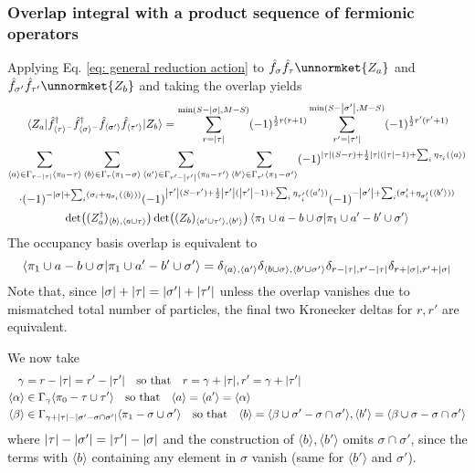 \documentclass[12pt]{article}
\newcommand{\seq}[1]{\langle #1\rangle}
\newcommand{\hc}{^\dagger}
\begin{document}
	\subsubsection{Overlap integral with a product sequence of fermionic operators}
	Applying Eq. \ref{eq: general reduction action} to $\hat{f}_{\sigma}\hat{f}_{\tau}\unnormket{Z_a}$ and $\hat{f}_{\sigma'}\hat{f}_{\tau'}\unnormket{Z_b}$ and taking the overlap yields
	\begin{multline}
	\mel{Z_a}{\hat{f}\hc_{\seq{\tau}^-}\hat{f}\hc_{\seq{\sigma}^-}\hat{f}_{\seq{\sigma'}}\hat{f}_{\seq{\tau'}}}{Z_b} = \sum_{r=\abs{\tau}}^{\min(S-\abs{\sigma}, M-S)}(-1)^{\frac{1}{2}r(r+1)}\sum_{r'=\abs{\tau'}}^{\min(S-\abs{\sigma'}, M-S)}(-1)^{\frac{1}{2}r'(r'+1)}\\
	\sum_{\seq{a}\in\Gamma_{r-\abs{\tau}}\seq{\pi_0-\tau}}\sum_{\seq{b}\in\Gamma_{r}\seq{\pi_1-\sigma}}\sum_{\seq{a'}\in\Gamma_{r'-\abs{\tau'}}\seq{\pi_0-\tau'}}\sum_{\seq{b'}\in\Gamma_{r'}\seq{\pi_1-\sigma'}}(-1)^{\abs{\tau}(S-r)+\frac{1}{2}\abs{\tau}(\abs{\tau}-1)+\sum_i\eta_{\tau_i}(\seq{a})}\\
	\cdot (-1)^{-\abs{\sigma}+\sum_i(\sigma_i+\eta_{\sigma_i}(\seq{b}))}(-1)^{\abs{\tau'}(S-r')+\frac{1}{2}\abs{\tau'}(\abs{\tau'}-1)+\sum_i\eta_{\tau'_i}(\seq{a'})}(-1)^{-\abs{\sigma'}+\sum_i(\sigma'_i+\eta_{\sigma'_i}(\seq{b'}))}\\
	\det((Z_a\hc)_{\seq{b},\seq{a\cup\tau}})\det((Z_b)_{\seq{a'\cup\tau'},\seq{b'}})\braket{\pi_1\cup a-b\cup\sigma}{\pi_1\cup a'-b'\cup\sigma'}
	\end{multline}
	The occupancy basis overlap is equivalent to
	\begin{equation}
	\braket{\pi_1\cup a-b\cup\sigma}{\pi_1\cup a'-b'\cup\sigma'}=\delta_{\seq{a},\seq{a'}}\delta_{\seq{b\cup\sigma},\seq{b'\cup\sigma'}}\delta_{r-\abs{\tau},r'-\abs{\tau}}\delta_{r+\abs{\sigma},r'+\abs{\sigma}}
	\end{equation}
	Note that, since $\abs{\sigma}+\abs{\tau}=\abs{\sigma'}+\abs{\tau'}$ unless the overlap vanishes due to mismatched total number of particles, the final two Kronecker deltas for $r,r'$ are equivalent.
	
	We now take
	\begin{align}
	\gamma &= r - \abs{\tau} = r' - \abs{\tau'}\qq{so that}r=\gamma+\abs{\tau},r'=\gamma+\abs{\tau'}\\
	\seq{\alpha}&\in\Gamma_{\gamma}\seq{\pi_0-\tau\cup\tau'}\qq{so that}\seq{a}=\seq{a'}=\seq{\alpha}\\
	\seq{\beta}&\in\Gamma_{\gamma+\abs{\tau}-\abs{\sigma'-\sigma\cap\sigma'}}\seq{\pi_1-\sigma\cup\sigma'}\qq{so that}\seq{b}=\seq{\beta\cup\sigma' - \sigma\cap\sigma'},\seq{b'}=\seq{\beta\cup\sigma - \sigma\cap\sigma'}
	\end{align}
	where $\abs{\tau}-\abs{\sigma'}=\abs{\tau'}-\abs{\sigma}$ and the construction of $\seq{b},\seq{b'}$ omits $\sigma\cap\sigma'$, since the terms with $\seq{b}$ containing any element in $\sigma$ vanish (same for $\seq{b'}$ and $\sigma'$).
	
\end{document}
